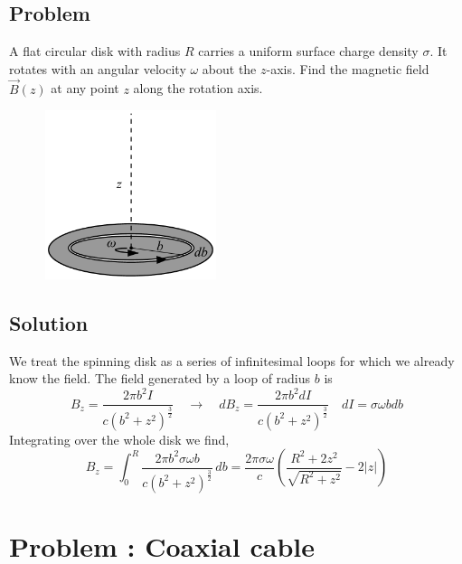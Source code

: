\documentclass[solutions]{esg8022pset}
\begin{document}
\subsection{Problem}
  A flat circular disk with radius $R$ carries a uniform surface charge density
  $\sigma$. It rotates with an angular velocity $\omega$ about the $z$-axis.
  Find the magnetic field $\vec{B}(z)$ at any point $z$ along the rotation
  axis.

    \begin{figure}[H]
    \centering
    \includegraphics[width = 5cm]{Spinningdisk}
  \end{figure}
\subsection{Solution}
  We treat the spinning disk as a series of infinitesimal loops for which we
  already know the field.
   The field generated by a loop of radius $b$ is
  $$B_z = \frac{2\pi b^2 I}{c(b^2+z^2)^{\frac{3}{2}}}\quad\to\quad dB_z = \frac{2\pi b^2 dI}{c(b^2+z^2)^{\frac{3}{2}}} \quad dI = \sigma\omega bdb$$
  Integrating over the whole disk we find,
  $$B_z = \int_0^R \frac{2\pi b^2 \sigma\omega b}{c(b^2+z^2)^{\frac{3}{2}}}\,db =
  \frac{2\pi\sigma\omega}{c}\left(\frac{R^2+2z^2}{\sqrt{R^2+z^2}}-2|z|\right)
  $$
\section{Problem \thesection: Coaxial cable}
\end{document}

